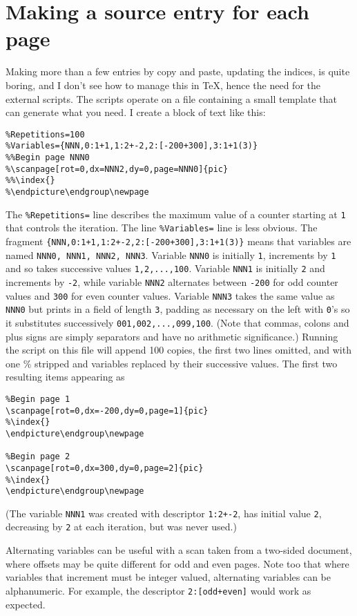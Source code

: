 \documentclass[11pt]{article}
\begin{document}
\section{Making a source entry for each page}
Making more than a few entries by copy and paste, updating the indices, is quite boring, and I don't see how to manage this in \TeX, hence the need for the external scripts. The scripts operate on a file containing  a small template that can generate what you need. I create a block of text like this:
\begin{verbatim}
%Repetitions=100
%Variables={NNN,0:1+1,1:2+-2,2:[-200+300],3:1+1(3)}
%%Begin page NNN0
%\scanpage[rot=0,dx=NNN2,dy=0,page=NNN0]{pic}
%%\index{}
%\endpicture\endgroup\newpage
\end{verbatim}
The \verb|%Repetitions=|
 line describes the maximum value of a counter starting at {\tt 1} that controls the iteration. The line \verb|%Variables=|
  line is less obvious. 
The fragment \verb|{NNN,0:1+1,1:2+-2,2:[-200+300],3:1+1(3)}| means that variables are named {\tt NNN0, NNN1, NNN2, NNN3}. Variable {\tt NNN0} is initially {\tt1}, increments by {\tt1} and  so takes successive values {\tt 1,2,...,100}. Variable {\tt NNN1} is initially {\tt2} and increments by {\tt -2}, while variable {\tt NNN2} alternates between {\tt -200} for odd counter values and {\tt300} for even counter values. Variable {\tt NNN3} takes the same value as {\tt NNN0} but prints in a field of length {\tt 3}, padding as necessary on the left with {\tt0}'s so it substitutes successively {\tt 001,002,...,099,100}. (Note that commas, colons and plus signs are simply separators and have no arithmetic significance.) Running the script on this file  will append 100 copies, the first two lines omitted, and with one \% stripped and variables replaced by their successive values. The first two resulting items appearing as
\begin{verbatim}
%Begin page 1
\scanpage[rot=0,dx=-200,dy=0,page=1]{pic}
%\index{}
\endpicture\endgroup\newpage

%Begin page 2
\scanpage[rot=0,dx=300,dy=0,page=2]{pic}
%\index{}
\endpicture\endgroup\newpage
\end{verbatim}
 (The variable {\tt NNN1} was created with descriptor {\tt1:2+-2}, has initial value {\tt 2}, decreasing by {\tt 2} at each iteration, but was never used.) 
 
  Alternating variables can be useful with a scan taken from a two-sided document, where offsets may be quite different for odd and even pages. Note too that where variables that increment must be integer valued, alternating variables can be alphanumeric. For example, the descriptor {\tt2:[odd+even]} would work as expected.
  
\end{document}
